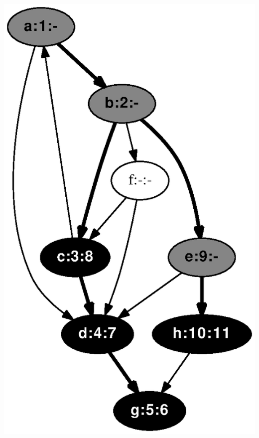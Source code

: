 \documentclass{article}
\begin{document}
\includegraphics[height=.3\textheight]{dfs_directed_classroom_11.eps}
\vspace{1em}
\end{document}

